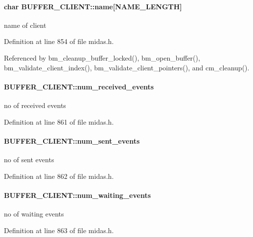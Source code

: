 \paragraph[{name}]{\setlength{\rightskip}{0pt plus 5cm}char {\bf BUFFER\_\-CLIENT::name}\mbox{[}NAME\_\-LENGTH\mbox{]}}\hfill\label{structBUFFER__CLIENT_aa626137fa4097c5a254a31d4f953a47f}
name of client 

Definition at line 854 of file midas.h.

Referenced by bm\_\-cleanup\_\-buffer\_\-locked(), bm\_\-open\_\-buffer(), bm\_\-validate\_\-client\_\-index(), bm\_\-validate\_\-client\_\-pointers(), and cm\_\-cleanup().
\paragraph[{num\_\-received\_\-events}]{ {\bf BUFFER\_\-CLIENT::num\_\-received\_\-events}}\hfill\label{structBUFFER__CLIENT_ae39c03ec4a903372ec71538032204556}
no of received events 

Definition at line 861 of file midas.h.
\paragraph[{num\_\-sent\_\-events}]{ {\bf BUFFER\_\-CLIENT::num\_\-sent\_\-events}}\hfill\label{structBUFFER__CLIENT_a035eae26fbcb45b445c5efde3acfacf7}
no of sent events 

Definition at line 862 of file midas.h.
\paragraph[{num\_\-waiting\_\-events}]{ {\bf BUFFER\_\-CLIENT::num\_\-waiting\_\-events}}\hfill\label{structBUFFER__CLIENT_ae4c382bab7844d80089d2e6e0f1a83ce}
no of waiting events 

Definition at line 863 of file midas.h.

